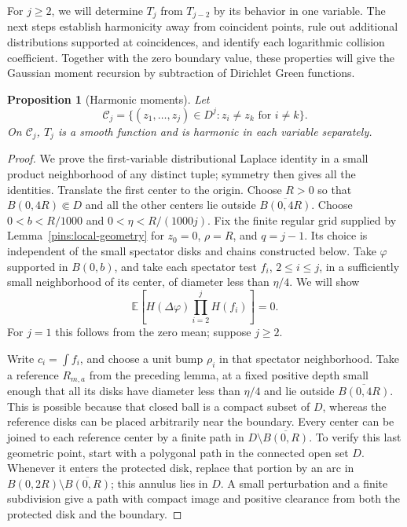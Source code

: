 \documentclass[11pt]{article}
\newtheorem{proposition}[theorem]{Proposition}
\theoremstyle{definition}
\theoremstyle{remark}
\numberwithin{equation}{section}
\begin{document}
For \(j\ge2\), we will determine \(T_j\) from \(T_{j-2}\) by its behavior
in one variable.  The next steps establish harmonicity away from coincident
points, rule out additional distributions supported at coincidences,
and identify each logarithmic collision coefficient.  Together with
the zero boundary value, these properties will give the Gaussian
moment recursion by subtraction of Dirichlet Green functions.

\begin{proposition}[Harmonic moments]
\label{prop:harmonic-moments}
Let
\[
 \mathcal C_j=\{(z_1,\ldots,z_j)\in D^j:
                         z_i\ne z_k\text{ for }i\ne k\}.
\]
On \(\mathcal C_j\), \(T_j\) is a smooth function and is harmonic in
each variable separately.
\end{proposition}

\begin{proof}
We prove the first-variable distributional Laplace identity in a
small product neighborhood of any distinct tuple; symmetry then gives
all the identities.  Translate the first center to the origin.
Choose \(R>0\) so that \(B(0,4R)\Subset D\) and all the other centers
lie outside \(\overline{B(0,4R)}\).  Choose \(0<b<R/1000\) and
\(0<\eta<R/(1000j)\).  Fix the finite regular grid supplied by
Lemma~\ref{pins:local-geometry} for \(z_0=0\), \(\rho=R\), and
\(q=j-1\).  Its choice is independent of the small spectator disks
and chains constructed below.
Take \(\varphi\) supported in \(B(0,b)\), and take each spectator
test \(f_i\), \(2\le i\le j\), in a sufficiently small neighborhood
of its center, of diameter less than \(\eta/4\).
We will show
\begin{equation}
       \mathbb E\left[H(\Delta\varphi)\prod_{i=2}^j H(f_i)\right]=0.
       \label{eq:limit-harmonic-tensor}
\end{equation}
For \(j=1\) this follows from the zero mean; suppose \(j\ge2\).

Write \(c_i=\int f_i\), and choose a unit bump \(\rho_i\) in that
spectator neighborhood.  Take a reference \(R_{m,a}\) from the
preceding lemma, at a fixed positive depth small enough that all
its disks have diameter less than \(\eta/4\) and lie outside
\(\overline{B(0,4R)}\).  This is possible because that closed ball
is a compact subset of \(D\), whereas the reference disks can be
placed arbitrarily near the boundary.
Every center can be joined to each reference center by a finite path
in \(D\setminus\overline{B(0,R)}\).  To verify this last geometric
point, start with a polygonal path in the connected open set \(D\).
Whenever it enters the protected disk, replace that portion by an
arc in \(B(0,2R)\setminus\overline{B(0,R)}\); this annulus lies in
\(D\).  A small perturbation and a finite subdivision give a path
with compact image and positive clearance from both the protected
disk and the boundary.


\end{proof}
\end{document}
